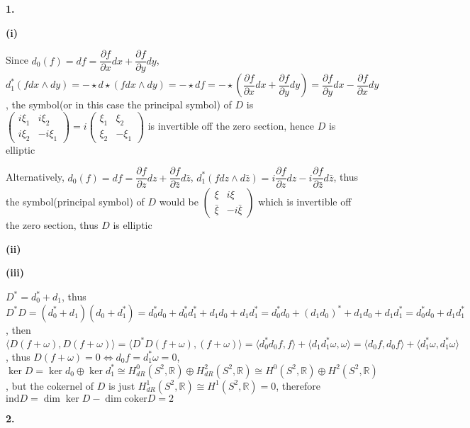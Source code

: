 \documentclass[../main.tex]{subfiles}
\begin{document}
\textbf{1.} \par
\textbf{(i)} \par
Since $d_0(f)=df=\dfrac{\partial f}{\partial x}dx+\dfrac{\partial f}{\partial y}dy$, $d_1^*(fdx\wedge dy)=-\star d\star(fdx\wedge dy)=-\star df=-\star\left(\dfrac{\partial f}{\partial x}dx+\dfrac{\partial f}{\partial y}dy\right)=\dfrac{\partial f}{\partial y}dx-\dfrac{\partial f}{\partial x}dy$, the symbol(or in this case the principal symbol) of $D$ is $\begin{pmatrix}
i\xi_1 & i\xi_2 \\
i\xi_2 & -i\xi_1
\end{pmatrix}=i\begin{pmatrix}
\xi_1 & \xi_2 \\
\xi_2 & -\xi_1
\end{pmatrix}$ is invertible off the zero section, hence $D$ is elliptic \par
Alternatively, $d_0(f)=df=\dfrac{\partial f}{\partial z}dz+\dfrac{\partial f}{\partial\bar z}d\bar z$, $d_1^*(fdz\wedge d\bar z)=i\dfrac{\partial f}{\partial z}dz-i\dfrac{\partial f}{\partial \bar z}d\bar z$, thus the symbol(principal symbol) of $D$ would be $\begin{pmatrix}
\xi & i\xi \\
\bar\xi & -i\bar\xi
\end{pmatrix}$ which is invertible off the zero section, thus $D$ is elliptic \par
\textbf{(ii)} \par

\textbf{(iii)} \par
$D^*=d_0^*+d_1$, thus $D^*D=(d_0^*+d_1)(d_0+d_1^*)=d_0^*d_0+d_0^*d_1^*+d_1d_0+d_1d_1^*=d_0^*d_0+(d_1d_0)^*+d_1d_0+d_1d_1^*=d_0^*d_0+d_1d_1^*$, then $\langle D(f+\omega),D(f+\omega)\rangle=\langle D^*D(f+\omega),(f+\omega)\rangle=\langle d_0^*d_0f,f\rangle+\langle d_1d_1^*\omega,\omega\rangle=\langle d_0f,d_0f\rangle+\langle d_1^*\omega,d_1^*\omega\rangle$, thus $D(f+\omega)=0\Leftrightarrow d_0f=d_1^*\omega=0$, $\ker D=\ker d_0\oplus\ker d_1^*\cong H_{dR}^0(S^2,\mathbb R)\oplus H_{dR}^2(S^2,\mathbb R)\cong H^0(S^2,\mathbb R)\oplus H^2(S^2,\mathbb R)$, but the cokernel of $D$ is just $H_{dR}^1(S^2,\mathbb R)\cong H^1(S^2,\mathbb R)=0$, therefore $\mathrm{ind}D=\dim\ker D-\dim\mathrm{coker}D=2$ \par
\textbf{2.} \par
\end{document}
